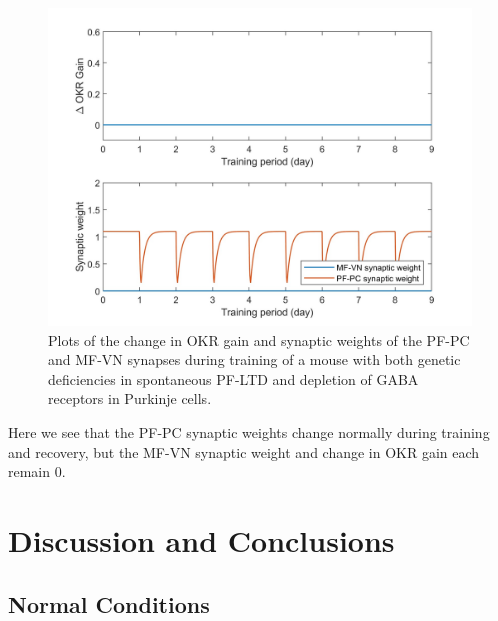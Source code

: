 \documentclass[10pt]{article}
\begin{document}
\begin{figure}[h]
    \centering
    \includegraphics[scale=0.13]{images/combined_LTD-deficiency_GABA-depletion.jpg}
    \caption{Plots of the change in OKR gain and synaptic weights of the PF-PC and MF-VN synapses during training of a mouse with both genetic deficiencies in spontaneous PF-LTD and depletion of GABA receptors in Purkinje cells.}
    \label{fig:combined-gene-results}
\end{figure}

Here we see that the PF-PC synaptic weights change normally during training and recovery, but the MF-VN synaptic weight and change in OKR gain each remain 0.

\section{Discussion and Conclusions}

\subsection{Normal Conditions}
\end{document}
